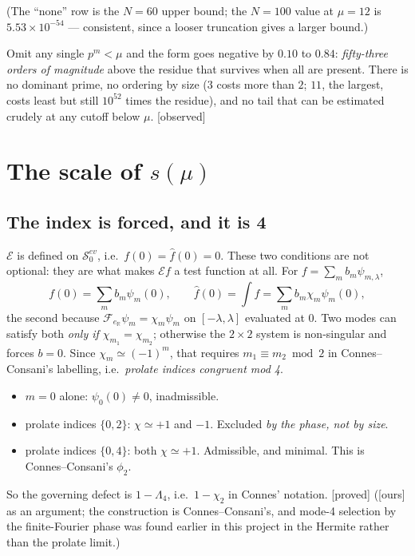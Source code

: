 \documentclass[11pt,a4paper]{article}
\theoremstyle{plain}
\theoremstyle{definition}
\theoremstyle{remark}
\newcommand{\st}[1]{{\normalfont\sffamily\footnotesize[#1]}}
\newcommand{\proved}{\st{proved}}
\newcommand{\observed}{\st{observed}}
\newcommand{\ours}{{\normalfont\sffamily\footnotesize[ours]}}
\newcommand{\R}{\mathbb{R}}
\newcommand{\E}{\mathcal{E}}
\newcommand{\F}{\mathcal{F}}
\begin{document}
\noindent(The ``none'' row is the $N=60$ upper bound; the $N=100$ value at
$\mu=12$ is $5.53\times10^{-54}$ --- consistent, since a looser truncation gives
a larger bound.)

Omit any single $p^m<\mu$ and the form goes negative by $0.10$ to $0.84$:
\emph{fifty-three orders of magnitude} above the residue that survives when all
are present.  There is no dominant prime, no ordering by size ($3$ costs more
than $2$; $11$, the largest, costs least but still $10^{52}$ times the residue),
and no tail that can be estimated crudely at any cutoff below $\mu$. \observed

\section{The scale of \texorpdfstring{$s(\mu)$}{s(mu)}}
\label{sec:scale}

\subsection{The index is forced, and it is 4}
\label{sec:index}

$\E$ is defined on $\mathcal S_0^{ev}$, i.e.\ $f(0)=\widehat f(0)=0$.  These two
conditions are not optional: they are what makes $\E f$ a test function at all.
For $f=\sum_mb_m\psi_{m,\lambda}$,
\[
  f(0)=\sum_mb_m\psi_m(0),\qquad
  \widehat f(0)=\int f=\sum_mb_m\chi_m\psi_m(0),
\]
the second because $\F_{e_\R}\psi_m=\chi_m\psi_m$ on $[-\lambda,\lambda]$
evaluated at $0$.  Two modes can satisfy both \emph{only if
$\chi_{m_1}=\chi_{m_2}$}; otherwise the $2\times2$ system is non-singular and
forces $b=0$.  Since $\chi_m\simeq(-1)^m$, that requires $m_1\equiv m_2\bmod2$
in Connes--Consani's labelling, i.e.\ \emph{prolate indices congruent mod 4}.

\begin{itemize}\itemsep1pt
\item $m=0$ alone: $\psi_0(0)\ne0$, inadmissible.
\item prolate indices $\{0,2\}$: $\chi\simeq+1$ and $-1$.  Excluded \emph{by the
phase, not by size}.
\item prolate indices $\{0,4\}$: both $\chi\simeq+1$.  Admissible, and minimal.
This is Connes--Consani's $\phi_2$.
\end{itemize}

\noindent So the governing defect is $1-\Lambda_4$, i.e.\ $1-\chi_2$ in Connes'
notation. \proved{} (\ours{} as an argument; the construction is
Connes--Consani's, and mode-4 selection by the finite-Fourier phase was found
earlier in this project in the Hermite rather than the prolate limit.)
\end{document}
